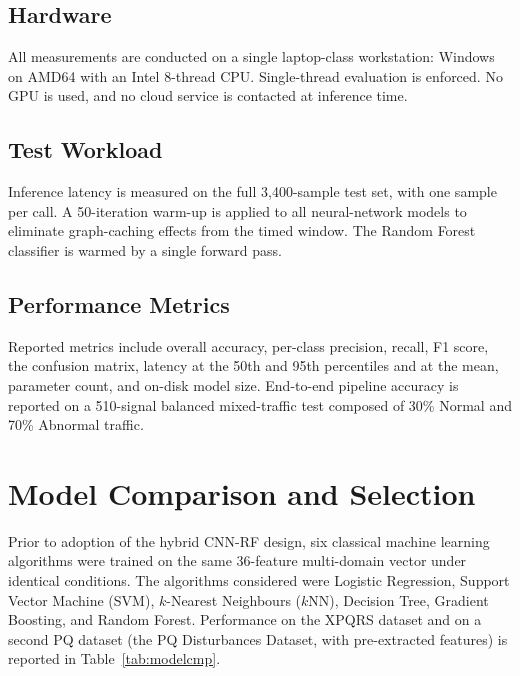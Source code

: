 \documentclass[conference]{IEEEtran}
\begin{document}
\subsection{Hardware}
All measurements are conducted on a single laptop-class workstation:
Windows on AMD64 with an Intel 8-thread CPU. Single-thread evaluation
is enforced. No GPU is used, and no cloud service is contacted at
inference time.

\subsection{Test Workload}
Inference latency is measured on the full 3{,}400-sample test set,
with one sample per call. A 50-iteration warm-up is applied to all
neural-network models to eliminate graph-caching effects from the
timed window. The Random Forest classifier is warmed by a single
forward pass.

\subsection{Performance Metrics}
Reported metrics include overall accuracy, per-class precision,
recall, F1 score, the confusion matrix, latency at the 50th and 95th
percentiles and at the mean, parameter count, and on-disk model size.
End-to-end pipeline accuracy is reported on a 510-signal balanced
mixed-traffic test composed of 30\% Normal and 70\% Abnormal traffic.

\section{Model Comparison and Selection}\label{sec:cmp}
Prior to adoption of the hybrid CNN-RF design, six classical machine
learning algorithms were trained on the same 36-feature multi-domain
vector under identical conditions. The algorithms considered were
Logistic Regression, Support Vector Machine (SVM), $k$-Nearest
Neighbours ($k$NN), Decision Tree, Gradient Boosting, and Random
Forest. Performance on the XPQRS dataset and on a second PQ dataset
(the PQ Disturbances Dataset, with pre-extracted features) is
reported in Table~\ref{tab:modelcmp}.
\end{document}

